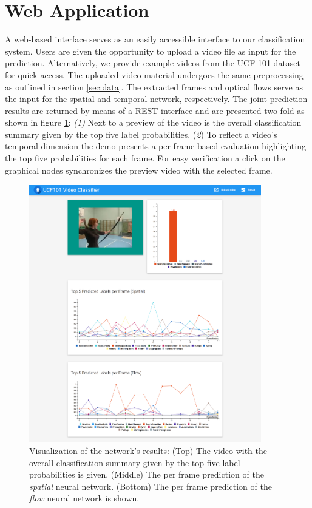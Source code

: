 \section{Web Application}
\label{sec:web}

A web-based interface serves as an easily accessible interface to our classification system.
Users are given the opportunity to upload a video file as input for the prediction.
Alternatively, we provide example videos from the UCF-101 dataset for quick access.
The uploaded video material undergoes the same preprocessing as outlined in section \ref{sec:data}.
The extracted frames and optical flows serve as the input for the spatial and temporal network, respectively.
The joint prediction results are returned by means of a REST interface and are presented two-fold as shown in figure \ref{fig:web_app}:
\textit{(1)} Next to a preview of the video is the overall classification summary given by the top five label probabilities.
(\textit{2}) To reflect a video’s temporal dimension the demo presents a per-frame based evaluation highlighting the top five probabilities for each frame.
For easy verification a click on the graphical nodes synchronizes the preview video with the selected frame.

\begin{figure}[!htb]
	\centering
	\includegraphics[width=0.9\textwidth]{images/screenshot.png}
	\caption{Visualization of the network's results: (Top) The video with the overall classification summary given by the top five label probabilities is given. (Middle) The per frame prediction of the \emph{spatial} neural network. (Bottom) The per frame prediction of the \emph{flow} neural network is shown.}
	\label{fig:web_app}
\end{figure}

